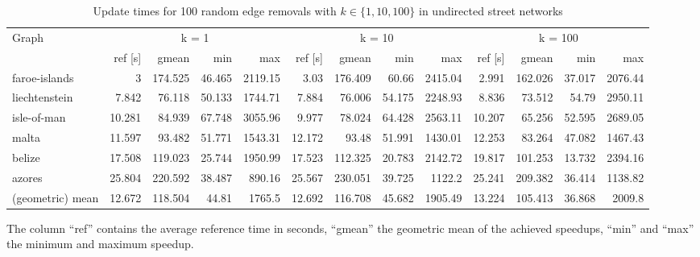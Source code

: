 \begin{landscape}

\begin{table}[h!]
\centering
\begin{tabular}{l|rrrr|rrrr|rrrr}
\toprule
Graph & \multicolumn{4}{c|}{k = 1} & \multicolumn{4}{c|}{k = 10} & \multicolumn{4}{c}{k = 100}\\
                &     ref [s] &   gmean &   min &     max &     ref [s] &   gmean &   min &     max &     ref [s] &   gmean &   min &     max \\
\midrule \midrule
 faroe-islands    &  3     & 174.525 & 46.465 & 2119.15 &  3.03  & 176.409 & 60.66  & 2415.04 &  2.991 & 162.026 & 37.017 & 2076.44 \\
 liechtenstein    &  7.842 &  76.118 & 50.133 & 1744.71 &  7.884 &  76.006 & 54.175 & 2248.93 &  8.836 &  73.512 & 54.79  & 2950.11 \\
 isle-of-man      & 10.281 &  84.939 & 67.748 & 3055.96 &  9.977 &  78.024 & 64.428 & 2563.11 & 10.207 &  65.256 & 52.595 & 2689.05 \\
 malta            & 11.597 &  93.482 & 51.771 & 1543.31 & 12.172 &  93.48  & 51.991 & 1430.01 & 12.253 &  83.264 & 47.082 & 1467.43 \\
 belize           & 17.508 & 119.023 & 25.744 & 1950.99 & 17.523 & 112.325 & 20.783 & 2142.72 & 19.817 & 101.253 & 13.732 & 2394.16 \\
 azores           & 25.804 & 220.592 & 38.487 &  890.16 & 25.567 & 230.051 & 39.725 & 1122.2  & 25.241 & 209.382 & 36.414 & 1138.82 \\ \midrule \midrule
 (geometric) mean & 12.672 & 118.504 & 44.81  & 1765.5  & 12.692 & 116.708 & 45.682 & 1905.49 & 13.224 & 105.413 & 36.868 & 2009.8  \\
\bottomrule
\end{tabular}
\caption{Update times for 100 random edge removals with  $k \in \{1, 10, 100\}$ in undirected street networks}{The column ``ref'' contains the average reference time in seconds, ``gmean'' the geometric mean of the achieved speedups, ``min'' and ``max'' the minimum and maximum speedup.}
\label{tbl:removalsUndirectedStreet}
\end{table}


\end{landscape}

